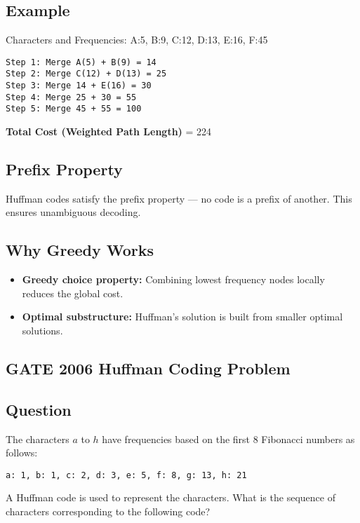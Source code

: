 \documentclass[14pt]{extarticle}
\begin{document}
\subsection{Example}
Characters and Frequencies: A:5, B:9, C:12, D:13, E:16, F:45

\begin{verbatim}
Step 1: Merge A(5) + B(9) = 14
Step 2: Merge C(12) + D(13) = 25
Step 3: Merge 14 + E(16) = 30
Step 4: Merge 25 + 30 = 55
Step 5: Merge 45 + 55 = 100
\end{verbatim}

\textbf{Total Cost (Weighted Path Length)} = 224

\subsection{Prefix Property}
Huffman codes satisfy the prefix property — no code is a prefix of another. This ensures unambiguous decoding.

\subsection{Why Greedy Works}
\begin{itemize}
    \item \textbf{Greedy choice property:} Combining lowest frequency nodes locally reduces the global cost.
    \item \textbf{Optimal substructure:} Huffman's solution is built from smaller optimal solutions.
\end{itemize}

\subsection{GATE 2006 Huffman Coding Problem}

\subsection*{Question}
The characters $a$ to $h$ have frequencies based on the first 8 Fibonacci numbers as follows:

\begin{center}
\texttt{a: 1, b: 1, c: 2, d: 3, e: 5, f: 8, g: 13, h: 21}
\end{center}

A Huffman code is used to represent the characters. What is the sequence of characters corresponding to the following code?
\end{document}
